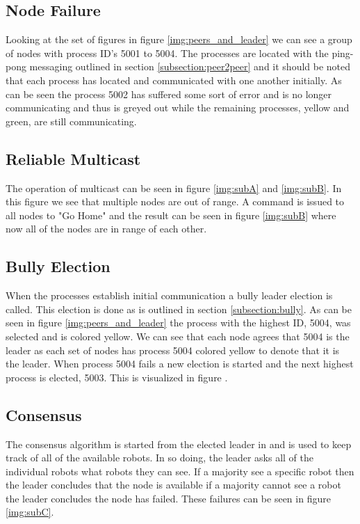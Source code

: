 \documentclass[10pt,letterpaper]{article}
\begin{document}
\subsection{Node Failure}
Looking at the set of figures in figure \ref{img:peers_and_leader} we can see a group of nodes with process ID's 5001 to 5004. The processes are located with the ping-pong messaging outlined in section \ref{subsection:peer2peer} and it should be noted that each process has located and communicated with one another initially. As can be seen the process 5002 has suffered some sort of error and is no longer communicating and thus is greyed out while the remaining processes, yellow and green, are still communicating.

\subsection{Reliable Multicast}
The operation of multicast can be seen in figure \ref{img:subA} and \ref{img:subB}. In this figure we see that multiple nodes are out of range. A command is issued to all nodes to "Go Home" and the result can be seen in figure \ref{img:subB} where now all of the nodes are in range of each other.

\subsection{Bully Election}
When the processes establish initial communication a bully leader election is called. This election is done as is outlined in section \ref{subsection:bully}. As can be seen in figure \ref{img:peers_and_leader} the process with the highest ID, 5004, was selected and is colored yellow. We can see that each node agrees that 5004 is the leader as each set of nodes has process 5004 colored yellow to denote that it is the leader. When process 5004 fails a new election is started and the next highest process is elected, 5003. This is visualized in figure .

\subsection{Consensus}
The consensus algorithm is started from the elected leader in and is used to keep track of all of the available robots. In so doing, the leader asks all of the individual robots what robots they can see. If a majority see a specific robot then the leader concludes that the node is available if a majority cannot see a robot the leader concludes the node has failed. These failures can be seen in figure \ref{img:subC}.
\end{document}
